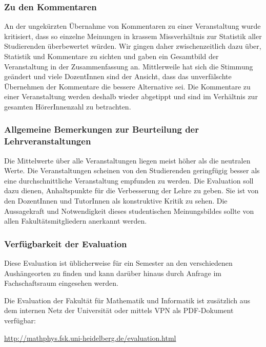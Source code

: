 \subsubsection{Zu den Kommentaren}

An der ungekürzten Übernahme von Kommentaren zu einer Veranstaltung wurde kritisiert, dass so einzelne Meinungen in krassem Missverhältnis zur Statistik aller Studierenden überbewertet würden. Wir gingen daher zwischenzeitlich dazu über, Statistik und Kommentare zu sichten und gaben ein Gesamtbild der Veranstaltung in der Zusammenfassung an. Mittlerweile hat sich die Stimmung geändert und viele DozentInnen sind der Ansicht, dass das unverfälschte Übernehmen der Kommentare die bessere Alternative sei. Die Kommentare zu einer Veranstaltung werden deshalb wieder abgetippt und sind im Verhältnis zur gesamten HörerInnenzahl zu betrachten.


\subsubsection{Allgemeine Bemerkungen zur Beurteilung der Lehrveranstaltungen}

Die Mittelwerte über alle Veranstaltungen liegen meist höher als die neutralen Werte. Die Veranstaltungen scheinen von den Studierenden geringfügig besser als eine durchschnittliche Veranstaltung empfunden zu werden. Die Evaluation soll dazu dienen, Anhaltspunkte für die Verbesserung der Lehre zu geben. Sie ist von den DozentInnen und TutorInnen als konstruktive Kritik zu sehen. Die Aussagekraft und Notwendigkeit dieses studentischen Meinungsbildes sollte von allen Fakultätsmitgliedern anerkannt werden.

\subsubsection{Verfügbarkeit der Evaluation}

Diese Evaluation ist üblicherweise für ein Semester an den verschiedenen Aushängeorten zu finden und kann darüber hinaus durch Anfrage im Fachschaftsraum eingesehen werden.

Die Evaluation der Fakultät für Mathematik und Informatik ist zusätzlich aus dem internen Netz der Universität oder mittels VPN als PDF-Dokument verfügbar:

\url{http://mathphys.fsk.uni-heidelberg.de/evaluation.html}
